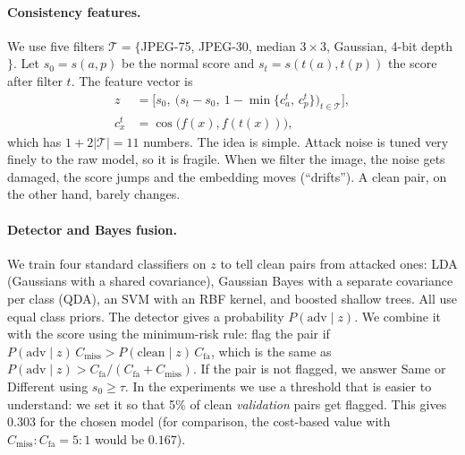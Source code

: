\paragraph{Consistency features.} We use five filters $\mathcal T=\{$JPEG-75, JPEG-30, median $3{\times}3$, Gaussian, 4-bit depth$\}$. Let $s_0=s(a,p)$ be the normal score and $s_t=s(t(a),t(p))$ the score after filter $t$. The feature vector is
\begin{equation}
\begin{split}
z&=\Big[s_0,\ \big(s_t-s_0,\ 1-\min\{c^t_a,\,c^t_p\}\big)_{t\in\mathcal T}\Big],\\
c^t_x&=\cos\big(f(x),f(t(x))\big),
\end{split}
\end{equation}
which has $1{+}2|\mathcal T|=11$ numbers. The idea is simple. Attack noise is tuned very finely to the raw model, so it is fragile. When we filter the image, the noise gets damaged, the score jumps and the embedding moves (``drifts''). A clean pair, on the other hand, barely changes.

\paragraph{Detector and Bayes fusion.} We train four standard classifiers on $z$ to tell clean pairs from attacked ones: LDA (Gaussians with a shared covariance), Gaussian Bayes with a separate covariance per class (QDA), an SVM with an RBF kernel, and boosted shallow trees. All use equal class priors. The detector gives a probability $P(\mathrm{adv}\mid z)$. We combine it with the score using the minimum-risk rule: flag the pair if $P(\mathrm{adv}\mid z)\,C_{\text{miss}}>P(\mathrm{clean}\mid z)\,C_{\text{fa}}$, which is the same as $P(\mathrm{adv}\mid z)>C_{\text{fa}}/(C_{\text{fa}}+C_{\text{miss}})$. If the pair is not flagged, we answer Same or Different using $s_0\ge\tau$. In the experiments we use a threshold that is easier to understand: we set it so that 5\% of clean \emph{validation} pairs get flagged. This gives $0.303$ for the chosen model (for comparison, the cost-based value with $C_{\text{miss}}{:}C_{\text{fa}}=5{:}1$ would be $0.167$).
